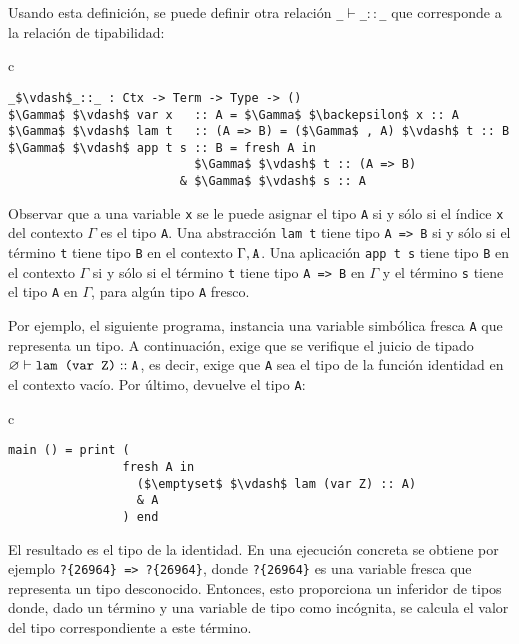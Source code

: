 Usando esta definición, se puede definir otra relación
\texttt{\_$\vdash$\_$::$\_}
que corresponde a la relación de tipabilidad:

\begin{center}
\begin{tabular}{c}
\begin{lstlisting}[mathescape=true]
_$\vdash$_::_ : Ctx -> Term -> Type -> ()
$\Gamma$ $\vdash$ var x   :: A = $\Gamma$ $\backepsilon$ x :: A
$\Gamma$ $\vdash$ lam t   :: (A => B) = ($\Gamma$ , A) $\vdash$ t :: B
$\Gamma$ $\vdash$ app t s :: B = fresh A in
                          $\Gamma$ $\vdash$ t :: (A => B)
                        & $\Gamma$ $\vdash$ s :: A
\end{lstlisting}
\end{tabular}
\end{center}
Observar que a una variable \verb|x| se le puede asignar el tipo \verb|A|
si y sólo si el índice \verb|x| del contexto $\Gamma$ es el tipo \verb|A|.
Una abstracción \verb|lam t|
tiene tipo \verb|A => B| si y sólo si
el término \verb|t| tiene tipo \verb|B| en el contexto $\Gamma,\verb|A|$.
Una aplicación \verb|app t s|
tiene tipo \verb|B| en el contexto $\Gamma$ si y sólo si
el término \verb|t| tiene tipo \verb|A => B| en $\Gamma$
y el término \verb|s| tiene el tipo \verb|A| en $\Gamma$,
para algún tipo \verb|A| fresco.
\bigskip

Por ejemplo, el siguiente programa,
instancia una variable simbólica fresca \verb|A| que representa un tipo.
A continuación, exige que se verifique el juicio de tipado 
$\emptyset \vdash \verb|lam (var Z)| :: \verb|A|$,
es decir, exige que \verb|A| sea el tipo de la función identidad 
en el contexto vacío.
Por último, devuelve el tipo \verb|A|:
\begin{center}
\begin{tabular}{c}
\begin{lstlisting}[mathescape=true]
main () = print (
                fresh A in
                  ($\emptyset$ $\vdash$ lam (var Z) :: A)
                  & A
                ) end
\end{lstlisting}
\end{tabular}
\end{center}
El resultado es el tipo de la identidad.
En una ejecución concreta se obtiene por ejemplo
\verb|?{26964} => ?{26964}|,
donde \verb|?{26964}| es una variable fresca que representa un tipo
desconocido.
Entonces, esto proporciona un inferidor de tipos donde, dado un término y una variable
de tipo como incógnita, se calcula el valor del tipo correspondiente a este término.
\bigskip

